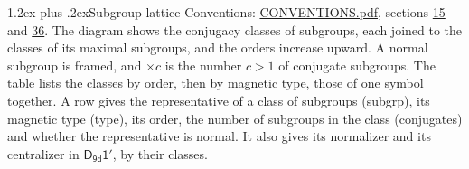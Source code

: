 \documentclass[10pt,a4paper]{article}
\makeatletter
\renewcommand\section{\@startsection{section}{1}{\z@}{-3ex plus -1ex minus -.2ex}%
  {1.2ex plus .2ex}{\normalfont\large\sffamily\bfseries\color{parttitle}}}
\numberwithin{equation}{section}
\newcommand{\grp}[1]{\mathsf{#1}}
\makeatother
\begin{document}
\section{Subgroup lattice}\label{s:subgroups}
Conventions: \href{../../CONVENTIONS.pdf}{CONVENTIONS.pdf}, sections \href{../../../rotation/CONVENTIONS.pdf\#conv.15}{15} and \href{../../CONVENTIONS.pdf\#conv.36}{36}.
The diagram shows the conjugacy classes of subgroups, each joined to the classes of its maximal subgroups, and the orders increase upward. \label{n:index.conjugates.c}\label{n:mark.conjugates}A normal subgroup is framed, and ${\times}c$ is the number $c > 1$ of conjugate subgroups. The table lists the classes by order, then by magnetic type, those of one symbol together. \label{n:head.subgroup}\label{n:head.magnetic.type}\label{n:head.order}\label{n:head.conjugates}\label{n:head.normal}A row gives the representative of a class of subgroups (subgrp), its magnetic type (type), its order, the number of subgroups in the class (conjugates) and whether the representative is normal. \label{n:head.normalizer}\label{n:head.centralizer}It also gives its normalizer and its centralizer in $\grp{D_{9d}1'}$, by their classes. 
\end{document}
